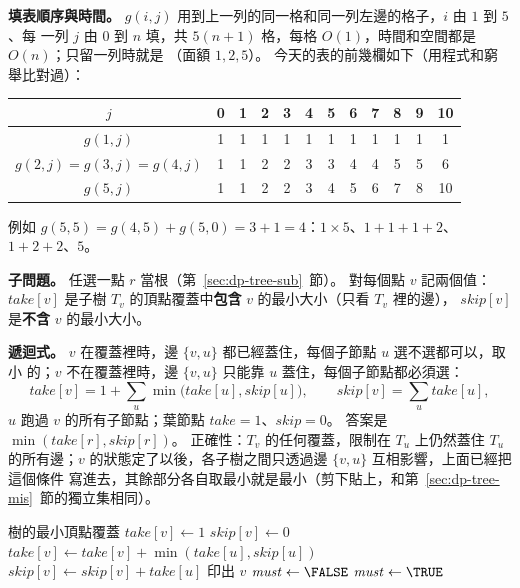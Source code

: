 \textbf{填表順序與時間。} $g(i, j)$ 用到上一列的同一格和同一列左邊的格子，$i$ 由 $1$ 到 $5$、每
一列 $j$ 由 $0$ 到 $n$ 填，共 $5(n + 1)$ 格，每格 $O(1)$，時間和空間都是 $O(n)$；只留一列時就是
（面額 $1, 2, 5$）。 今天的表的前幾欄如下（用程式和窮舉比對過）：
\begin{center}
\small
\begin{tabular}{c*{11}{c}}
\toprule
$j$ & 0 & 1 & 2 & 3 & 4 & 5 & 6 & 7 & 8 & 9 & 10 \\
\midrule
$g(1, j)$ & 1 & 1 & 1 & 1 & 1 & 1 & 1 & 1 & 1 & 1 & 1 \\
$g(2, j) = g(3, j) = g(4, j)$ & 1 & 1 & 2 & 2 & 3 & 3 & 4 & 4 & 5 & 5 & 6 \\
$g(5, j)$ & 1 & 1 & 2 & 2 & 3 & 4 & 5 & 6 & 7 & 8 & 10 \\
\bottomrule
\end{tabular}
\end{center}
例如 $g(5, 5) = g(4, 5) + g(5, 0) = 3 + 1 = 4$：$1 \times 5$、$1 + 1 + 1 + 2$、$1 + 2 + 2$、$5$。

\textbf{子問題。} 任選一點 $r$ 當根（第~\ref{sec:dp-tree-sub}~節）。 對每個點 $v$ 記兩個值：
$\mathit{take}[v]$ 是子樹 $T_v$ 的頂點覆蓋中\textbf{包含} $v$ 的最小大小（只看 $T_v$ 裡的邊），
$\mathit{skip}[v]$ 是\textbf{不含} $v$ 的最小大小。

\textbf{遞迴式。} $v$ 在覆蓋裡時，邊 $\{v, u\}$ 都已經蓋住，每個子節點 $u$ 選不選都可以，取小
的；$v$ 不在覆蓋裡時，邊 $\{v, u\}$ 只能靠 $u$ 蓋住，每個子節點都必須選：
\[
\mathit{take}[v] = 1 + \sum_{u} \min\bigl(\mathit{take}[u], \mathit{skip}[u]\bigr), \qquad
\mathit{skip}[v] = \sum_{u} \mathit{take}[u],
\]
$u$ 跑過 $v$ 的所有子節點；葉節點 $\mathit{take} = 1$、$\mathit{skip} = 0$。 答案是
$\min(\mathit{take}[r], \mathit{skip}[r])$。 正確性：$T_v$ 的任何覆蓋，限制在 $T_u$ 上仍然蓋住
$T_u$ 的所有邊；$v$ 的狀態定了以後，各子樹之間只透過邊 $\{v, u\}$ 互相影響，上面已經把這個條件
寫進去，其餘部分各自取最小就是最小（剪下貼上，和第~\ref{sec:dp-tree-mis}~節的獨立集相同）。

\begin{pseudo}[label=alg:dp-px-vc]{樹的最小頂點覆蓋}
    \State $\mathit{take}[v] \gets 1$
    \State $\mathit{skip}[v] \gets 0$
            \State {}
            \State $\mathit{take}[v] \gets \mathit{take}[v] + \min(\mathit{take}[u], \mathit{skip}[u])$
            \State $\mathit{skip}[v] \gets \mathit{skip}[v] + \mathit{take}[u]$
        \EndIf
    \EndFor
\EndProcedure
\Statex
{} 
        \State 印出 $v$
        \State $\mathit{must} \gets \FALSE$
    \Else
        \State $\mathit{must} \gets \TRUE$ 
    \EndIf
            \State {}
        \EndIf
    \EndFor
\EndProcedure
\end{pseudo}

